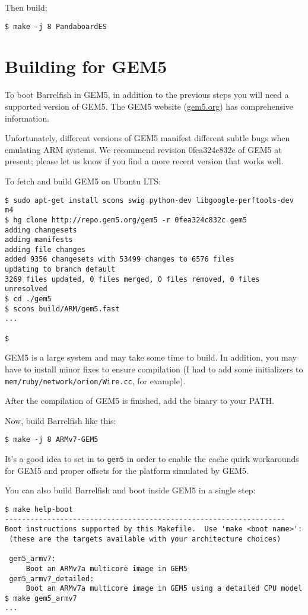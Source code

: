 \documentclass[a4paper,twoside]{report} %
\begin{document}
Then build:

\begin{lstlisting}
$ make -j 8 PandaboardES
\end{lstlisting}

\section{Building for GEM5}

To boot Barrelfish in GEM5, in addition to the previous steps you
will need a supported version of GEM5.  The GEM5 website
(\url{gem5.org}) has comprehensive information. 

Unfortunately, different
versions of GEM5 manifest different subtle bugs when emulating ARM
systems.  We recommend revision 0fea324c832c of GEM5 at present;
please let us know if you find a more recent version that works well. 

To fetch and build GEM5 on Ubuntu LTS:

\begin{lstlisting}
$ sudo apt-get install scons swig python-dev libgoogle-perftools-dev m4
$ hg clone http://repo.gem5.org/gem5 -r 0fea324c832c gem5
adding changesets
adding manifests
adding file changes
added 9356 changesets with 53499 changes to 6576 files
updating to branch default
3269 files updated, 0 files merged, 0 files removed, 0 files unresolved
$ cd ./gem5 
$ scons build/ARM/gem5.fast
...

$
\end{lstlisting}

GEM5 is a large system and may take some time to build.  In addition,
you may have to install minor fixes to ensure compilation (I had to
add some initializers to \texttt{mem/ruby/network/orion/Wire.cc}, for
example). 

After the compilation of GEM5 is finished, add the binary to your PATH.

Now, build Barrelfish like this:
\begin{lstlisting}
$ make -j 8 ARMv7-GEM5
\end{lstlisting}

It's a good idea to set  in
 to \texttt{gem5} in order to enable
the cache quirk workarounds for GEM5 and proper offsets for the
platform simulated by GEM5.

You can also build Barrelfish and boot inside GEM5 in a single step:

\begin{lstlisting}
$ make help-boot
------------------------------------------------------------------
Boot instructions supported by this Makefile.  Use 'make <boot name>':
 (these are the targets available with your architecture choices)

 gem5_armv7:
	 Boot an ARMv7a multicore image in GEM5
 gem5_armv7_detailed:
	 Boot an ARMv7a multicore image in GEM5 using a detailed CPU model
$ make gem5_armv7
...
\end{lstlisting}
\end{document}
